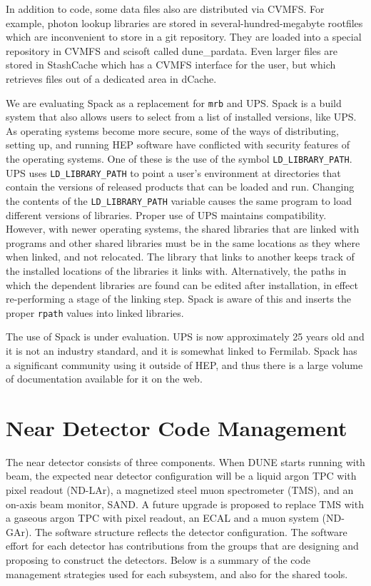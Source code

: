 \documentclass[../main-v1.tex]{subfiles}
\begin{document}
In addition to code, some data files also are distributed via CVMFS.  For example, photon lookup libraries are stored in several-hundred-megabyte rootfiles which are inconvenient to store in a git repository.  They are loaded into a special repository in CVMFS and scisoft called dune\_pardata.  Even larger files are stored in StashCache which has a CVMFS interface for the user, but which retrieves files out of a dedicated area in dCache.

We are evaluating Spack as a replacement for {\tt mrb} and UPS.  Spack is a build system that also allows users to select from a list of installed versions, like UPS.  As operating systems become more secure, some of the ways of distributing, setting up, and running HEP software have conflicted with security features of the operating systems.  One of these is the use of the symbol {\tt LD\_LIBRARY\_PATH}.  UPS uses {\tt LD\_LIBRARY\_PATH} to point a user's environment at directories that contain the versions of released products that can be loaded and run.  Changing the contents of the {\tt LD\_LIBRARY\_PATH} variable causes the same program to load different versions of libraries.  Proper use of UPS maintains compatibility.  However, with newer operating systems, the shared libraries that are linked with programs and other shared libraries must be in the same locations as they where when linked, and not relocated.  The library that links to another keeps track of the installed locations of the libraries it links with.  Alternatively, the paths in which the dependent libraries are found can be edited after installation, in effect re-performing a stage of the linking step.  Spack is aware of this and inserts the proper {\tt rpath} values into linked libraries.

The use of Spack is under evaluation.  UPS is now approximately 25 years old and it is not an industry standard, and it is somewhat linked to Fermilab.  Spack has a significant community using it outside of HEP, and thus there is a large volume of documentation available for it on the web.

\section{Near Detector Code Management }
\label{sec:codemgmt:neardet}  %

The near detector consists of three components.  When DUNE starts running with beam, the expected near detector configuration will be a liquid argon TPC with pixel readout (ND-LAr), a magnetized steel muon spectrometer (TMS), and an on-axis beam monitor, SAND.  A future upgrade is proposed to replace TMS with a gaseous argon TPC with pixel readout, an ECAL and a muon system (ND-GAr). The software structure reflects the detector configuration.  The software effort for each detector has contributions from the groups that are designing and proposing to construct the detectors.  Below is a summary of the code management strategies used for each subsystem, and also for the shared tools.
\end{document}
